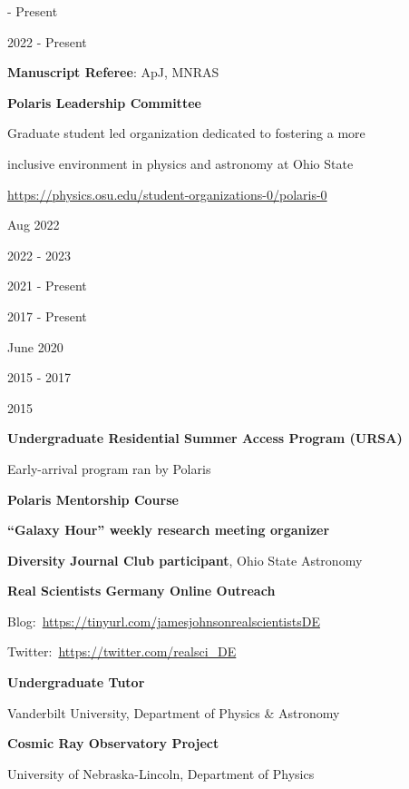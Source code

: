 \documentclass[cv.tex]{subfiles}
\begin{document}
\parbox{0.18\textwidth}{%
	 - Present \par
	2022 - Present \par
	\null \par
	\null \par
	\null \par
}
\hspace{1mm}
\parbox{0.8\textwidth}{%
	\vspace{1mm}
	\textbf{Manuscript Referee}: ApJ, MNRAS \par
	\textbf{Polaris Leadership Committee} \par
	Graduate student led organization dedicated to fostering a more \par
	inclusive environment in physics and astronomy at Ohio State \par
	\url{https://physics.osu.edu/student-organizations-0/polaris-0} \par
}

\noindent
\parbox{0.18\textwidth}{%
	\raggedleft
	Aug 2022 \par
	\null \par
	2022 - 2023 \par
	2021 - Present \par
	2017 - Present \par
	June 2020 \par
	\null \par
	\null \par
	2015 - 2017 \par
	\null \par
	2015 \par
	\null \par
}
\hspace{1mm}
\parbox{0.8\textwidth}{%
	\vspace{1mm}
	\textbf{Undergraduate Residential Summer Access Program (URSA)} \par
	Early-arrival program ran by Polaris \par
	\textbf{Polaris Mentorship Course} \par
	\textbf{``Galaxy Hour'' weekly research meeting organizer} \par
	\textbf{Diversity Journal Club participant}, Ohio State Astronomy \par
	\textbf{Real Scientists Germany Online Outreach} \par
	Blog:~\url{https://tinyurl.com/jamesjohnsonrealscientistsDE} \par
	Twitter:~\url{https://twitter.com/realsci_DE} \par
	\textbf{Undergraduate Tutor} \par
	Vanderbilt University, Department of Physics \& Astronomy \par
	\textbf{Cosmic Ray Observatory Project} \par
	University of Nebraska-Lincoln, Department of Physics \par
}
\end{document}
